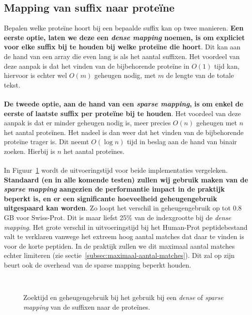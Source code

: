 \subsection{Mapping van suffix naar proteïne}\label{subsec:mapping-van-suffix-naar-proteine}
Bepalen welke proteïne hoort bij een bepaalde suffix kan op twee manieren.
\textbf{Een eerste optie, laten we deze een \textit{dense mapping} noemen, is om expliciet voor elke suffix bij te houden bij welke proteïne die hoort}.
Dit kan aan de hand van een array die even lang is als het aantal suffixen.
Het voordeel van deze aanpak is dat het vinden van de bijbehorende proteïne in $O(1)$ tijd kan, hiervoor is echter wel $O(m)$ geheugen nodig, met $m$ de lengte van de totale tekst.
\\ \\
\textbf{De tweede optie, aan de hand van een \textit{sparse mapping}, is om enkel de eerste of laatste suffix per proteïne bij te houden}.
Het voordeel van deze aanpak is dat er minder geheugen nodig is, meer precies $O(n)$ geheugen met $n$ het aantal proteïnen.
Het nadeel is dan weer dat het vinden van de bijbehorende proteïne trager is.
Dit neemt $O(\log n)$ tijd in beslag aan de hand van binair zoeken.
Hierbij is $n$ het aantal proteïnes.
\\ \\
In Figuur~\ref{fig:dense_vs_sparse} wordt de uitvoeringstijd voor beide implementaties vergeleken.
\textbf{Standaard (en in alle komende testen) zullen wij gebruik maken van de \textit{sparse mapping} aangezien de performantie impact in de praktijk beperkt is, en er een significante hoeveelheid geheugengebruik uitgespaard kan worden}.
Zo loopt het verschil in geheugengebruik op tot 0.8 GB voor Swiss-Prot.
Dit is maar liefst 25\% van de indexgrootte bij de \textit{dense mapping}.
Het grote verschil in uitvoeringstijd bij het Human-Prot peptidebestand valt te verklaren vanwege het extreem hoog aantal matches dat daar te vinden is voor de korte peptiden.
In de praktijk zullen we dit maximaal aantal matches echter limiteren (zie sectie~\ref{subsec:maximaal-aantal-matches}).
Dit zal op zijn beurt ook de overhead van de sparse mapping beperkt houden.
\begin{figure}[H]
    \centering
    \\[4ex] %

    \caption{Zoektijd en geheugengebruik bij het gebruik bij een \textit{dense} of \textit{sparse mapping} van de suffixen naar de proteïnes.}\label{fig:dense_vs_sparse}
\end{figure}

